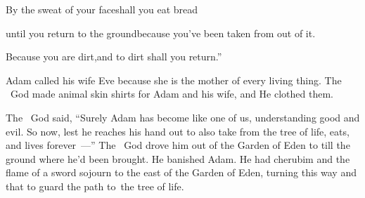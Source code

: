 \begin{inparaenum}
  \pa{} By the sweat of your face\pa{}shall you eat bread%

  \pb{}until you return to the ground\pa{}because you've been taken from out of it.%

  \pb{}Because you are dirt,\pa{}and to dirt shall you return.''%

   Adam called his wife Eve because she is the mother of every living thing.%
   The \lord\ God made animal skin shirts for Adam and his wife, and He clothed them.%

   The \lord\ God said, ``Surely Adam has become like one of us, understanding good and evil. So now, lest he reaches his hand out to also take from the tree of life, eats, and lives forever~---''%
   The \lord\ God drove him out of the Garden of Eden to till the ground where he'd been brought.%
   He banished Adam. He had cherubim and the flame of a sword sojourn to the east of the Garden of Eden, turning this way and that to guard the path to\understood{}\ the tree of life.%
\end{inparaenum}
